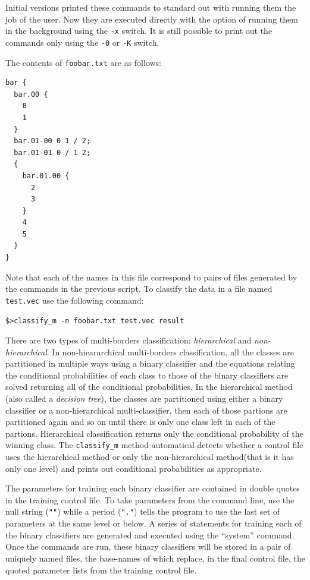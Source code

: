 \documentclass[12pt]{article}
\begin{document}
Initial versions printed these commands to standard out with running them the
job of the user. Now they are executed directly with the option of 
running them in the background using the \verb"-x" switch.
It is still possible to print out the commands only using the \verb"-0"
or \verb"-K" switch.

The contents of \verb"foobar.txt" are as follows:
\begin{verbatim}
bar {
  bar.00 {
    0
    1 
  }
  bar.01-00 0 1 / 2;
  bar.01-01 0 / 1 2;
  {
    bar.01.00 {
      2
      3
    }
    4
    5
  }
}
\end{verbatim}

Note that each of the names in this file correspond to pairs of files generated by the commands in the previous script. To classify the data in a file named \verb"test.vec" use the following command:

\begin{verbatim}
$>classify_m -n foobar.txt test.vec result
\end{verbatim}

There are two types of multi-borders classification: {\it hierarchical} and {\it non-hierarchical}.  In non-hieararchical multi-borders classification, all the classes are partitioned in multiple ways using a binary classifier and the equations relating the conditional probabilities of each class to those of the binary classifiers are solved returning all of the conditional probabilities.  In the hierarchical method (also called a {\it decision tree}), the classes are partitioned using either a binary classifier or a non-hierarchical multi-classifier, then each of those partions are partitioned again and so on until there is only one class left in each of the partions.  Hierarchical classification returns only the conditional probability of the winning class.  The \verb/classify_m/ method automatical detects whether a control file uses the hierarchical method or only the non-hierarchical method(that is it has only one level) and prints out conditional probabilities as appropriate.  

  The parameters for training each binary classifier are contained in double quotes in the training control file.  To take parameters from the command line, use the null string (\verb/""/) while a period (\verb/"."/) tells the program to use the last set of parameters at the same level or below.  A series of statements for training each of the binary classifiers are generated and executed using the ``system'' command.  Once the commands are run, these binary classifiers will be stored in a pair of uniquely named files, the base-names of which replace, in the final control file, the quoted parameter lists from the training control file.
\end{document}
